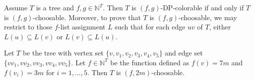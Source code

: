 \documentclass[10pt,a4paper]{amsart}
\begin{document}
\begin{lemma}
    \label{lem-choosable}
    Assume $T$ is a tree and $f,g \in \mathbb{N}^T$. Then $T$ is $(f,g)$-DP-colorable if and only if $T$ is $(f,g)$-choosable. Moreover, to prove that $T$ is $(f,g)$-choosable, we may restrict to those $f$-list assignment $L$ such that for each edge $uv$ of $T$, either $L(u) \subseteq L(v)$ or $L(v) \subseteq L(u)$.
\end{lemma}

\begin{lemma}
\label{lem-star5}
    Let $T$ be the tree with vertex set $\{ v,v_1,v_2,v_3,v_4,v_5\}$ and edge set $\{ vv_1,vv_2,vv_3,vv_4,vv_5\}$. Let $f\in \mathbb{N}^T$ be the function defined as $f(v)=7m$ and $f(v_i)=3m$ for $i=1,\dots,5$. Then $T$ is $(f,2m)$-choosable.
\end{lemma}
\end{document}
